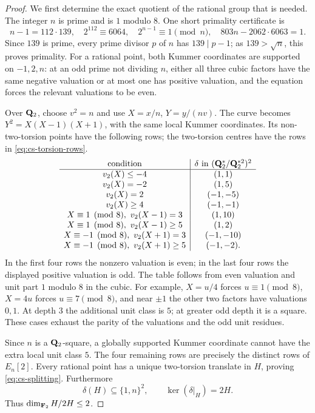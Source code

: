 \begin{proof}
We first determine the exact quotient of the rational group that is
needed.  The integer $n$ is prime and is $1$ modulo $8$.  One short primality
certificate is
\[
 n-1=112\cdot139,\quad 2^{112}\equiv6064,\quad
 2^{n-1}\equiv1\pmod n,\quad 803n-2062\cdot6063=1.
\]
Since $139$ is prime, every prime divisor $p$ of $n$ has
$139\mid p-1$; as $139>\sqrt n$, this proves primality.
For a rational point, both Kummer coordinates are supported on $-1,2,n$: at an odd
prime not dividing $n$, either all three cubic factors have the same
negative valuation or at most one has positive valuation, and the
equation forces the relevant valuations to be even.

Over $\mathbf Q_2$, choose $v^2=n$ and use $X=x/n$, $Y=y/(nv)$.
The curve becomes $Y^2=X(X-1)(X+1)$, with the same local Kummer
coordinates.  Its non-two-torsion points have the following rows; the
two-torsion centres have the rows in \eqref{eq:cs-torsion-rows}.
\begin{equation}\label{eq:cs-eight-local-rows}
\begin{array}{c|c}
\text{condition}&\delta\text{ in }(\mathbf Q_2^*/\mathbf Q_2^{*2})^2\\ \hline
v_2(X)\leq-4&(1,1)\\
v_2(X)=-2&(1,5)\\
v_2(X)=2&(-1,-5)\\
v_2(X)\geq4&(-1,-1)\\
X\equiv1\pmod8,\ v_2(X-1)=3&(1,10)\\
X\equiv1\pmod8,\ v_2(X-1)\geq5&(1,2)\\
X\equiv-1\pmod8,\ v_2(X+1)=3&(-1,-10)\\
X\equiv-1\pmod8,\ v_2(X+1)\geq5&(-1,-2).
\end{array}
\end{equation}
In the first four rows the nonzero valuation is even; in the last four
rows the displayed positive valuation is odd.  The table follows from
even valuation and unit part $1$ modulo $8$ in the cubic.  For example,
$X=u/4$ forces $u\equiv1\pmod8$, $X=4u$ forces
$u\equiv7\pmod8$, and near $\pm1$ the other two factors have valuations
$0,1$.  At depth $3$ the additional unit class is $5$; at greater odd
depth it is a square.  These cases exhaust the parity of the valuations
and the odd unit residues.

Since $n$ is a $\mathbf Q_2$-square, a globally supported Kummer coordinate
cannot have the extra local unit class $5$.  The four remaining rows
are precisely the distinct rows of $E_n[2]$.  Every rational point has
a unique two-torsion translate in $H$, proving
\eqref{eq:cs-splitting}.  Furthermore
\[
 \delta(H)\subseteq\{1,n\}^2,
 \qquad \ker(\delta|_H)=2H.
\]
Thus $\dim_{\mathbf F_2}H/2H\leq2$.


\end{proof}
